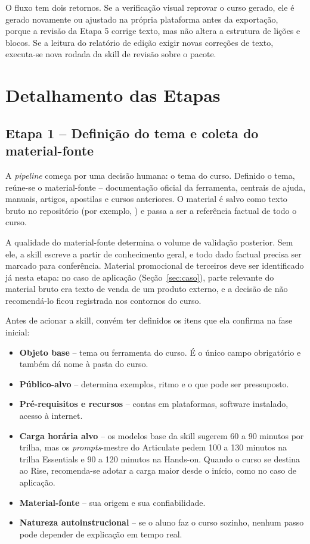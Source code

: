 \documentclass[12pt,a4paper]{article}
\begin{document}
O fluxo tem dois retornos. Se a verificação visual reprovar o curso gerado, ele é gerado novamente ou ajustado na própria plataforma antes da exportação, porque a revisão da Etapa 5 corrige texto, mas não altera a estrutura de lições e blocos. Se a leitura do relatório de edição exigir novas correções de texto, executa-se nova rodada da skill de revisão sobre o pacote.

\section{Detalhamento das Etapas}\label{sec:etapas}

\subsection{Etapa 1 -- Definição do tema e coleta do material-fonte}

A \textit{pipeline} começa por uma decisão humana: o tema do curso. Definido o tema, reúne-se o material-fonte -- documentação oficial da ferramenta, centrais de ajuda, manuais, artigos, apostilas e cursos anteriores. O material é salvo como texto bruto no repositório (por exemplo, ) e passa a ser a referência factual de todo o curso.

A qualidade do material-fonte determina o volume de validação posterior. Sem ele, a skill escreve a partir de conhecimento geral, e todo dado factual precisa ser marcado para conferência. Material promocional de terceiros deve ser identificado já nesta etapa: no caso de aplicação (Seção~\ref{sec:caso}), parte relevante do material bruto era texto de venda de um produto externo, e a decisão de não recomendá-lo ficou registrada nos contornos do curso.

Antes de acionar a skill, convém ter definidos os itens que ela confirma na fase inicial:

\begin{itemize}[leftmargin=*]
\item \textbf{Objeto base} -- tema ou ferramenta do curso. É o único campo obrigatório e também dá nome à pasta do curso.
\item \textbf{Público-alvo} -- determina exemplos, ritmo e o que pode ser pressuposto.
\item \textbf{Pré-requisitos e recursos} -- contas em plataformas, software instalado, acesso à internet.
\item \textbf{Carga horária alvo} -- os modelos base da skill sugerem 60 a 90 minutos por trilha, mas os \textit{prompts}-mestre do Articulate pedem 100 a 130 minutos na trilha Essentials e 90 a 120 minutos na Hands-on. Quando o curso se destina ao Rise, recomenda-se adotar a carga maior desde o início, como no caso de aplicação.
\item \textbf{Material-fonte} -- sua origem e sua confiabilidade.
\item \textbf{Natureza autoinstrucional} -- se o aluno faz o curso sozinho, nenhum passo pode depender de explicação em tempo real.
\end{itemize}
\end{document}
